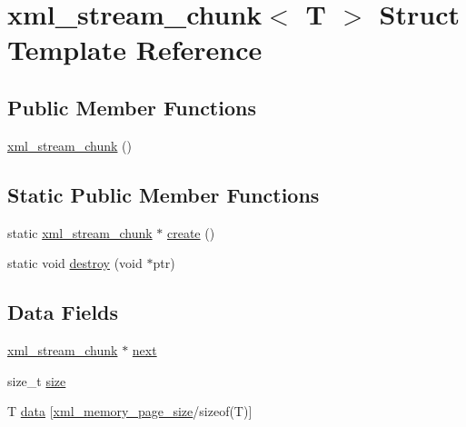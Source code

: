 \hypertarget{structxml__stream__chunk}{\section{xml\-\_\-stream\-\_\-chunk$<$ T $>$ Struct Template Reference}
\label{structxml__stream__chunk}
}
\subsection*{Public Member Functions}
\begin{DoxyCompactItemize}
\item 
\hyperlink{structxml__stream__chunk_a8b87fcb2074014dd252f752a95092337}{xml\-\_\-stream\-\_\-chunk} ()
\end{DoxyCompactItemize}
\subsection*{Static Public Member Functions}
\begin{DoxyCompactItemize}
\item 
static \hyperlink{structxml__stream__chunk}{xml\-\_\-stream\-\_\-chunk} $\ast$ \hyperlink{structxml__stream__chunk_a92cffe33c529ff266329fd4afb59226d}{create} ()
\item 
static void \hyperlink{structxml__stream__chunk_a4b812901d59950d48d539e5c8726a0e8}{destroy} (void $\ast$ptr)
\end{DoxyCompactItemize}
\subsection*{Data Fields}
\begin{DoxyCompactItemize}
\item 
\hyperlink{structxml__stream__chunk}{xml\-\_\-stream\-\_\-chunk} $\ast$ \hyperlink{structxml__stream__chunk_ad00071f7340adb2bde7c4157d4100b3c}{next}
\item 
size\-\_\-t \hyperlink{structxml__stream__chunk_a42618ba3b7bda1246cfc640149fc34eb}{size}
\item 
T \hyperlink{structxml__stream__chunk_a365e2e228a0277467b25a0fea42b8518}{data} \mbox{[}\hyperlink{pugixml_8cpp_aa040c77beb7349f7473f072b6dd364b9}{xml\-\_\-memory\-\_\-page\-\_\-size}/sizeof(T)\mbox{]}
\end{DoxyCompactItemize}


